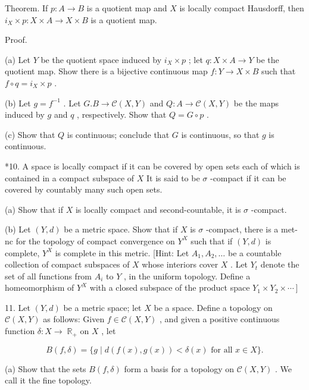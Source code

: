 \documentclass[10pt]{article}
\begin{document}
Theorem. If \(p : A \rightarrow  B\) is a quotient map and \(X\) is locally compact Hausdorff, then \({i}_{X} \times  p : X \times  A \rightarrow  X \times  B\) is a quotient map.

Proof.

(a) Let \(Y\) be the quotient space induced by \({i}_{X} \times  p\) ; let \(q : X \times  A \rightarrow  Y\) be the quotient map. Show there is a bijective continuous map \(f : Y \rightarrow  X \times  B\) such that \(f \circ  q = {i}_{X} \times  p\) .

(b) Let \(g = {f}^{-1}\) . Let \(G.B \rightarrow  \mathcal{C}\left( {X,Y}\right)\) and \(Q : A \rightarrow  \mathcal{C}\left( {X,Y}\right)\) be the maps induced by \(g\) and \(q\) , respectively. Show that \(Q = G \circ  p\) .

(c) Show that \(Q\) is continuous; conclude that \(G\) is continuous, so that \(g\) is continuous.

*10. A space is locally compact if it can be covered by open sets each of which is contained in a compact subspace of \(X\) It is said to be \(\sigma\) -compact if it can be covered by countably many such open sets.

(a) Show that if \(X\) is locally compact and second-countable, it is \(\sigma\) -compact.

(b) Let \(\left( {Y,d}\right)\) be a metric space. Show that if \(X\) is \(\sigma\) -compact, there is a met-nc for the topology of compact convergence on \({Y}^{X}\) such that if \(\left( {Y,d}\right)\) is complete, \({Y}^{X}\) is complete in this metric. [Hint: Let \({A}_{1},{A}_{2},\ldots\) be a countable collection of compact subspaces of \(X\) whose interiors cover \(X\) . Let \({Y}_{t}\) denote the set of all functions from \({A}_{i}\) to \(Y\) , in the uniform topology. Define a homeomorphism of \({Y}^{X}\) with a closed subspace of the product space \(\left. {{Y}_{1} \times  {Y}_{2} \times  \cdots }\right\rbrack\)

11. Let \(\left( {Y,d}\right)\) be a metric space; let \(X\) be a space. Define a topology on \(\mathcal{C}\left( {X,Y}\right)\) as follows: Given \(f \in  \mathcal{C}\left( {X,Y}\right)\) , and given a positive continuous function \(\delta  : X \rightarrow \; {\mathbb{R}}_{ + }\) on \(X\) , let

\[
B\left( {f,\delta }\right)  = \{ g \mid  d\left( {f\left( x\right) ,g\left( x\right) }\right)  < \delta \left( x\right) \text{ for all }x \in  X\} .
\]

(a) Show that the sets \(B\left( {f,\delta }\right)\) form a basis for a topology on \(\mathcal{C}\left( {X,Y}\right)\) . We call it the fine topology.
\end{document}
